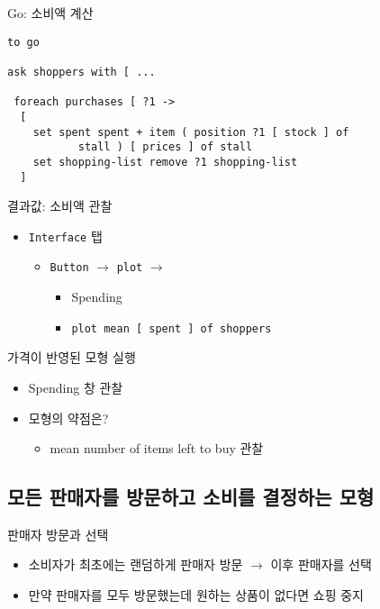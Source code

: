 \documentclass[hyperref={unicode}]{beamer}
\begin{document}
\begin{frame}[fragile]{Go: 소비액 계산}
\begin{verbatim}
to go

ask shoppers with [ ...
 
 foreach purchases [ ?1 ->
  [ 
    set spent spent + item ( position ?1 [ stock ] of 
           stall ) [ prices ] of stall 
    set shopping-list remove ?1 shopping-list
  ] 
\end{verbatim}
\end{frame}

\begin{frame}[fragile]{결과값: 소비액 관찰}
\begin{itemize}
\item \verb|Interface| 탭
	\begin{itemize}
	\item \verb|Button| $\rightarrow$ \verb|plot| $\rightarrow$ 
		\begin{itemize}
		\item Spending
		\item \verb|plot mean [ spent ] of shoppers |
		\end{itemize}	
	\end{itemize}
\end{itemize}	
\end{frame}


\begin{frame}[fragile]{가격이 반영된 모형 실행}
\begin{itemize}
\item Spending 창 관찰
\item 모형의 약점은?
	\begin{itemize}
	\item mean number of items left to buy 관찰
	\end{itemize}
\end{itemize}	
\end{frame}

\subsection{모든 판매자를 방문하고 소비를 결정하는 모형}
\begin{frame}[fragile]{판매자 방문과 선택}
\begin{itemize}
\item 소비자가 최초에는 랜덤하게 판매자 방문 $\rightarrow$ 이후 판매자를 선택
\item 만약 판매자를 모두 방문했는데 원하는 상품이 없다면 쇼핑 중지
\end{itemize}	
\end{frame}
\end{document}
